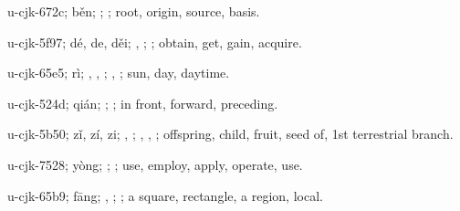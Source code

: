 \begin{multicols}{2}
{\cjkgGlue{}u-cjk-672c; běn; \cjkgGlue{}; \cjkgGlue{}; root, origin, source, basis.

\cjkgGlue{}u-cjk-5f97; dé, de, děi; \cjkgGlue{}\cjkgGlue{}\cjkgGlue{}, \cjkgGlue{}\cjkgGlue{}\cjkgGlue{}; \cjkgGlue{}; obtain, get, gain, acquire.

\cjkgGlue{}u-cjk-65e5; rì; \cjkgGlue{}, \cjkgGlue{}, \cjkgGlue{}; \cjkgGlue{}, \cjkgGlue{}; sun, day, daytime.

\cjkgGlue{}u-cjk-524d; qián; \cjkgGlue{}; \cjkgGlue{}; in front, forward, preceding.

\cjkgGlue{}u-cjk-5b50; zǐ, zí, zi; \cjkgGlue{}, \cjkgGlue{}; \cjkgGlue{}, \cjkgGlue{}, \cjkgGlue{}; offspring, child, fruit, seed of, 1st terrestrial branch.

\cjkgGlue{}u-cjk-7528; yòng; \cjkgGlue{}\cjkgGlue{}\cjkgGlue{}; \cjkgGlue{}; use, employ, apply, operate, use.

\cjkgGlue{}u-cjk-65b9; fāng; \cjkgGlue{}, \cjkgGlue{}; \cjkgGlue{}; a square, rectangle, a region, local.

}
\end{multicols}
